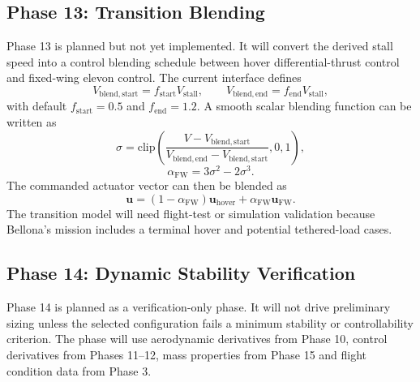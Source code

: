 \subsection{Phase 13: Transition Blending}
\label{subsec:ppa_phase13}

Phase 13 is planned but not yet implemented. It will convert the derived stall speed into a control blending schedule between hover differential-thrust control and fixed-wing elevon control. The current interface defines
\begin{equation}
    V_{\mathrm{blend,start}} =
    f_{\mathrm{start}}V_{\mathrm{stall}},
    \qquad
    V_{\mathrm{blend,end}} =
    f_{\mathrm{end}}V_{\mathrm{stall}},
    \label{eq:ppa_blend_speeds}
\end{equation}
with default \(f_{\mathrm{start}}=0.5\) and \(f_{\mathrm{end}}=1.2\). A smooth scalar blending function can be written as
\begin{equation}
    \sigma =
    \mathrm{clip}\left(
    \frac{V-V_{\mathrm{blend,start}}}
    {V_{\mathrm{blend,end}}-V_{\mathrm{blend,start}}},
    0,1
    \right),
    \label{eq:ppa_blend_sigma}
\end{equation}
\begin{equation}
    \alpha_{\mathrm{FW}} =
    3\sigma^2-2\sigma^3 .
    \label{eq:ppa_smoothstep}
\end{equation}
The commanded actuator vector can then be blended as
\begin{equation}
    \mathbf{u} =
    (1-\alpha_{\mathrm{FW}})\mathbf{u}_{\mathrm{hover}}
    +
    \alpha_{\mathrm{FW}}\mathbf{u}_{\mathrm{FW}} .
    \label{eq:ppa_control_blend}
\end{equation}
The transition model will need flight-test or simulation validation because Bellona's mission includes a terminal hover and potential tethered-load cases.

\subsection{Phase 14: Dynamic Stability Verification}
\label{subsec:ppa_phase14}

Phase 14 is planned as a verification-only phase. It will not drive preliminary sizing unless the selected configuration fails a minimum stability or controllability criterion. The phase will use aerodynamic derivatives from Phase 10, control derivatives from Phases 11--12, mass properties from Phase 15 and flight condition data from Phase 3.

